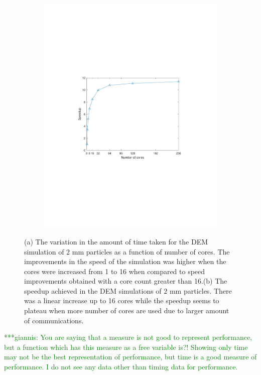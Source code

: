 \documentclass[preprint,11pt,authoryear]{elsarticle}
\newcommand{\gpnote}[1]{{\textcolor{green} {***giannis: #1}}}
\newcommand{\gpnote}[1]{}
\begin{document}
\begin{figure}
\begin{subfigure}{.45\textwidth}
\includegraphics[scale=0.6]{rslsts_2mm_DEM_speedup_mtlb.pdf}
\caption{}
\label{fig:rslts_DEM_speedup}
\end{subfigure}
\caption{(a) The variation in the amount of time taken for the DEM simulation of 2 mm particles as 
a function of number of cores. The improvements in the speed of the simulation was higher when the 
cores were increased from 1 to 16 when compared to speed improvements obtained with a core count greater 
than 16.(b) The speedup achieved in the DEM simulations of 2 mm particles. There 
was a linear increase up to 16 cores while the speedup seems to plateau when 
more number of cores are used due to larger amount of communications.}
\end{figure} 


\gpnote{You are saying that a measure is not good to represent performance, but a function which has
this measure as a free variable is?! Showing only time may not be the best representation of performance,
but time is a good measure of performance. I do not see any data other than timing data for performance.}
\end{document}

